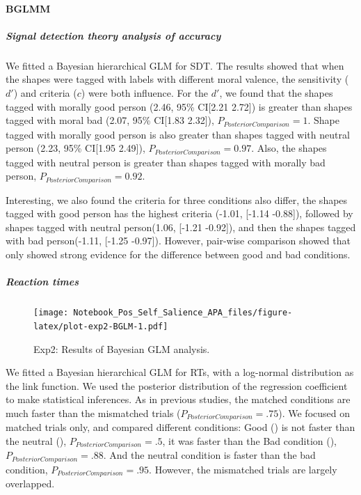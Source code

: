 \documentclass[
  english,
  man]{apa6}
\let\oldparagraph\paragraph
\renewcommand{\paragraph}[1]{\oldparagraph{#1}\mbox{}}
\let\oldsubparagraph\subparagraph
\renewcommand{\subparagraph}[1]{\oldsubparagraph{#1}\mbox{}}
\begin{document}
\hypertarget{bglmm}{%
\paragraph{BGLMM}\label{bglmm}}

\hypertarget{signal-detection-theory-analysis-of-accuracy-2}{%
\subparagraph{Signal detection theory analysis of accuracy}\label{signal-detection-theory-analysis-of-accuracy-2}}

We fitted a Bayesian hierarchical GLM for SDT. The results showed that when the shapes were tagged with labels with different moral valence, the sensitivity (\(d'\)) and criteria (\(c\)) were both influence. For the \(d'\), we found that the shapes tagged with morally good person (2.46, 95\% CI{[}2.21 2.72{]}) is greater than shapes tagged with moral bad (2.07, 95\% CI{[}1.83 2.32{]}), \(P_{PosteriorComparison} = 1\). Shape tagged with morally good person is also greater than shapes tagged with neutral person (2.23, 95\% CI{[}1.95 2.49{]}), \(P_{PosteriorComparison} = 0.97\). Also, the shapes tagged with neutral person is greater than shapes tagged with morally bad person, \(P_{PosteriorComparison} = 0.92\).

Interesting, we also found the criteria for three conditions also differ, the shapes tagged with good person has the highest criteria (-1.01, {[}-1.14 -0.88{]}), followed by shapes tagged with neutral person(1.06, {[}-1.21 -0.92{]}), and then the shapes tagged with bad person(-1.11, {[}-1.25 -0.97{]}). However, pair-wise comparison showed that only showed strong evidence for the difference between good and bad conditions.

\hypertarget{reaction-times-2}{%
\subparagraph{Reaction times}\label{reaction-times-2}}

\begin{figure}
\centering
\texttt{[image: Notebook\_Pos\_Self\_Salience\_APA\_files/figure-latex/plot-exp2-BGLM-1.pdf]}
\caption{\label{fig:plot-exp2-BGLM}Exp2: Results of Bayesian GLM analysis.}
\end{figure}

We fitted a Bayesian hierarchical GLM for RTs, with a log-normal distribution as the link function. We used the posterior distribution of the regression coefficient to make statistical inferences. As in previous studies, the matched conditions are much faster than the mismatched trials (\(P_{PosteriorComparison} = .75\)). We focused on matched trials only, and compared different conditions: Good () is not faster than the neutral (), \(P_{PosteriorComparison} = .5\), it was faster than the Bad condition (), \(P_{PosteriorComparison} = .88\). And the neutral condition is faster than the bad condition, \(P_{PosteriorComparison} = .95\). However, the mismatched trials are largely overlapped.
\end{document}
